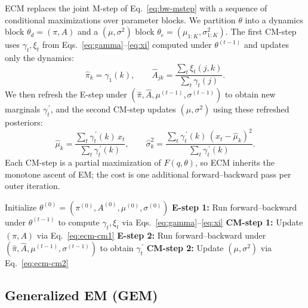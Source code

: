 \documentclass{article}
\begin{document}
ECM replaces the joint M-step of
Eq.~\eqref{eq:bw-mstep} with a sequence of conditional maximizations
over parameter blocks. We partition $\theta$ into a dynamics block
$\theta_d = (\pi, A)$ and a $(\mu, \sigma^2)$ block
$\theta_e = (\mu_{1:K}, \sigma_{1:K}^2)$. The first CM-step uses
$\gamma_t, \xi_t$ from Eqs.~\eqref{eq:gamma}--\eqref{eq:xi} computed
under $\theta^{(t-1)}$ and updates only the dynamics:
\begin{equation}
  \hat\pi_k = \gamma_1(k), \qquad
  \hat A_{jk} = \frac{\sum_t \xi_t(j,k)}{\sum_t \gamma_t(j)}.
  \label{eq:ecm-cm1}
\end{equation}
We then refresh the E-step under
$(\hat\pi, \hat A, \mu^{(t-1)}, \sigma^{(t-1)})$ to obtain new marginals
$\gamma_t^{\,\prime}$, and the second CM-step updates $(\mu, \sigma^2)$
using these refreshed posteriors:
\begin{equation}
  \hat\mu_k = \frac{\sum_t \gamma_t^{\,\prime}(k)\, x_t}{\sum_t \gamma_t^{\,\prime}(k)},
  \qquad
  \hat\sigma_k^2 = \frac{\sum_t \gamma_t^{\,\prime}(k)\,(x_t - \hat\mu_k)^2}{\sum_t \gamma_t^{\,\prime}(k)}.
  \label{eq:ecm-cm2}
\end{equation}
Each CM-step is a partial maximization of $F(q, \theta)$, so ECM
inherits the monotone ascent of EM; the cost is
one additional forward--backward pass per outer iteration.

\begin{algorithm}[ht]
  \caption{Expectation Conditional Maximization (ECM)}
  \begin{algorithmic}[1]
    \State Initialize $\theta^{(0)} = (\pi^{(0)}, A^{(0)}, \mu^{(0)}, \sigma^{(0)})$
    \Repeat
    \State \textbf{E-step 1:} Run forward--backward under
    $\theta^{(t-1)}$ to compute $\gamma_t, \xi_t$ via
    Eqs.~\eqref{eq:gamma}--\eqref{eq:xi}
    \State \textbf{CM-step 1:} Update $(\pi, A)$ via Eq.~\eqref{eq:ecm-cm1}
    \State \textbf{E-step 2:} Run forward--backward under
    $(\hat\pi, \hat A, \mu^{(t-1)}, \sigma^{(t-1)})$ to obtain
    $\gamma_t^{\,\prime}$
    \State \textbf{CM-step 2:} Update $(\mu, \sigma^2)$ via Eq.~\eqref{eq:ecm-cm2}
  \end{algorithmic}
\end{algorithm}

\subsection{Generalized EM (GEM)}
\end{document}
